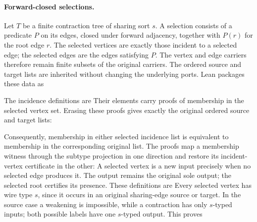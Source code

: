 \paragraph{Forward-closed selections.}
Let $T$ be a finite contraction tree of sharing sort $s$. A selection consists
of a predicate $P$ on its edges, closed under forward adjacency, together with
$P(r)$ for the root edge $r$. The selected vertices are exactly those incident
to a selected edge; the selected edges are the edges satisfying $P$.
The vertex and edge carriers therefore remain finite subsets of the original
carriers. The ordered source and target lists are inherited without changing
the underlying ports. Lean packages these data as
\par{}
The incidence definitions are
Their elements carry proofs of membership in the selected vertex set. Erasing
these proofs gives exactly the original ordered source and target lists:
\par{}
Consequently, membership in either selected incidence list is equivalent to
membership in the corresponding original list. The proofs map a membership
witness through the subtype projection in one direction and restore its
incident-vertex certificate in the other:
A selected vertex is a new input precisely when no selected edge produces it.
The output remains the original sole output; the selected root certifies its
presence. These definitions are
Every selected vertex has wire type $s$, since it occurs in an original
sharing-edge source or target. In the source case a weakening is impossible,
while a contraction has only $s$-typed inputs; both possible labels have one
$s$-typed output. This proves
\par{}

